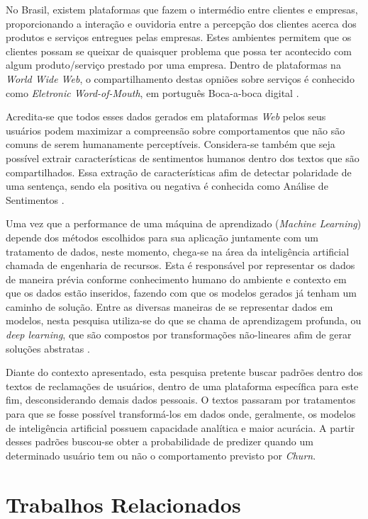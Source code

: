 \documentclass[12pt]{article}
\begin{document}
No Brasil, existem plataformas que fazem o intermédio entre clientes e empresas, proporcionando a interação e ouvidoria entre a percepção dos clientes acerca dos produtos e serviços entregues pelas empresas. Estes ambientes permitem que os clientes possam se queixar de quaisquer problema que possa ter acontecido com algum produto/serviço prestado por uma empresa. Dentro de plataformas na \textit{World Wide Web}, o compartilhamento destas opniões sobre serviços é conhecido como \emph{Eletronic Word-of-Mouth}, em português Boca-a-boca digital \cite{almeida:17}. 

Acredita-se que todos esses dados gerados em plataformas \textit{Web} pelos seus usuários podem maximizar a compreensão sobre comportamentos que não são comuns de serem humanamente perceptíveis. Considera-se também que seja possível extrair características de sentimentos humanos dentro dos textos que são compartilhados. Essa extração de características afim de detectar polaridade de uma sentença, sendo ela positiva ou negativa é conhecida como Análise de Sentimentos \cite{malheiros:13}.

Uma vez que a performance de uma máquina de aprendizado (\textit{Machine Learning}) depende dos métodos escolhidos para sua aplicação juntamente com um tratamento de dados, neste momento, chega-se na área da inteligência artificial chamada de engenharia de recursos. Esta é responsável por representar os dados de maneira prévia conforme conhecimento humano do ambiente e contexto em que os dados estão inseridos, fazendo com que os modelos gerados já tenham um caminho de solução. Entre as diversas maneiras de se representar dados em modelos, nesta pesquisa utiliza-se do que se chama de aprendizagem profunda, ou \emph{deep learning}, que são compostos por transformações não-lineares afim de gerar soluções abstratas \cite{bengio:13}.

Diante do contexto apresentado, esta pesquisa pretente buscar padrões dentro dos textos de reclamações de usuários, dentro de uma plataforma específica para este fim, desconsiderando demais dados pessoais. O textos passaram por tratamentos para que se fosse possível transformá-los em dados onde, geralmente, os modelos de inteligência artificial possuem capacidade analítica e maior acurácia. A partir desses padrões buscou-se obter a probabilidade de predizer quando um determinado usuário tem ou não o comportamento previsto por \emph{Churn}.

\section{Trabalhos Relacionados}\label{sec:related}
\end{document}
